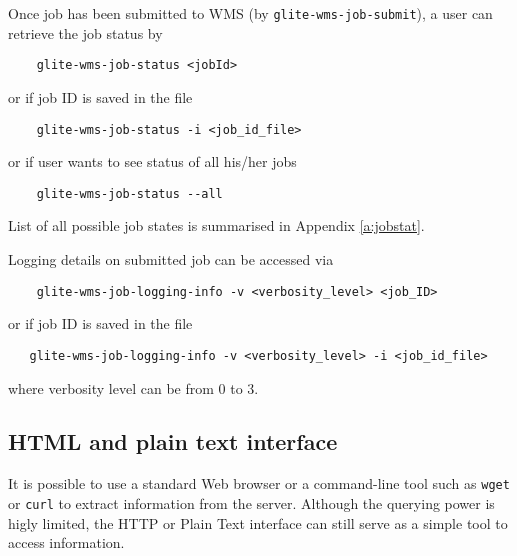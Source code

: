 Once job has been submitted to WMS (by \verb'glite-wms-job-submit'), 
a user can retrieve the job status by
\begin{verbatim}
    glite-wms-job-status <jobId>
\end{verbatim}
or if job ID is saved in the file
\begin{verbatim}
    glite-wms-job-status -i <job_id_file>
\end{verbatim}
or if user wants to see status of all his/her jobs
\begin{verbatim}
    glite-wms-job-status --all
\end{verbatim}
List of all possible job states is summarised in Appendix \ref{a:jobstat}.

Logging details on submitted job can be accessed via
\begin{verbatim}
    glite-wms-job-logging-info -v <verbosity_level> <job_ID>
\end{verbatim}
or if job ID is saved in the file
\begin{verbatim}
   glite-wms-job-logging-info -v <verbosity_level> -i <job_id_file>
\end{verbatim}
where verbosity level can be from 0 to 3. 







\subsection{HTML and plain text interface}

It is possible to use a standard Web browser or a command-line tool such as \texttt{wget} or \texttt{curl} to extract information from the \LB server. Although the querying power is higly limited, the HTTP or Plain Text interface can still serve as a simple tool to access information.

